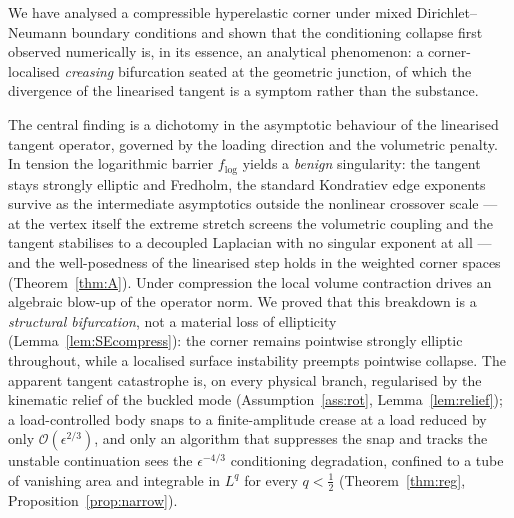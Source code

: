 We have analysed a compressible hyperelastic corner under mixed Dirichlet--Neumann boundary conditions and shown that
the conditioning collapse first observed numerically is, in its essence, an analytical phenomenon: a corner-localised
\emph{creasing} bifurcation seated at the geometric junction, of which the divergence of the linearised tangent is a
symptom rather than the substance.

The central finding is a dichotomy in the asymptotic behaviour of the linearised tangent operator, governed by the
loading direction and the volumetric penalty. In tension the logarithmic barrier $f_{\log}$ yields a \emph{benign}
singularity: the tangent stays strongly elliptic and Fredholm, the standard Kondratiev edge exponents survive as the
intermediate asymptotics outside the nonlinear crossover scale --- at the vertex itself the extreme stretch screens the
volumetric coupling and the tangent stabilises to a decoupled Laplacian with no singular exponent at all --- and the
well-posedness of the linearised step holds in the weighted corner spaces (Theorem~\ref{thm:A}). Under compression the
local volume contraction drives an algebraic blow-up of the operator norm. We proved that this breakdown is a
\emph{structural bifurcation}, not a material loss of ellipticity (Lemma~\ref{lem:SEcompress}): the corner remains
pointwise strongly elliptic throughout, while a localised surface instability preempts pointwise collapse. The apparent
tangent catastrophe is, on every physical branch, regularised by the kinematic relief of the buckled mode
(Assumption~\ref{ass:rot}, Lemma~\ref{lem:relief}); a load-controlled body snaps to a finite-amplitude crease at a load
reduced by only $\mathcal{O}(\epsilon^{2/3})$, and only an algorithm that suppresses the snap and tracks the unstable
continuation sees the $\epsilon^{-4/3}$ conditioning degradation, confined to a tube of vanishing area and integrable in
$L^q$ for every $q<\tfrac12$ (Theorem~\ref{thm:reg}, Proposition~\ref{prop:narrow}).


